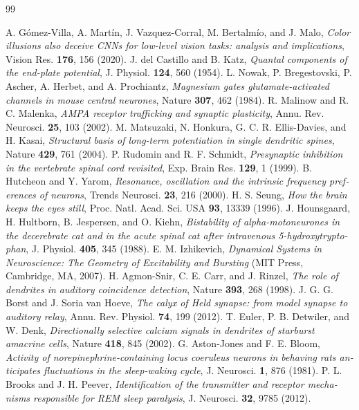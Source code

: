 \begin{thebibliography}{99}
\begin{otherlanguage}{english}
 A. G\'omez-Villa, A. Mart\'in, J. Vazquez-Corral, M. Bertalm\'io, and J. Malo, \emph{Color illusions also deceive CNNs for low-level vision tasks: analysis and implications}, Vision Res. \textbf{176}, 156 (2020).
 J. del Castillo and B. Katz, \emph{Quantal components of the end-plate potential}, J. Physiol. \textbf{124}, 560 (1954).
 L. Nowak, P. Bregestovski, P. Ascher, A. Herbet, and A. Prochiantz, \emph{Magnesium gates glutamate-activated channels in mouse central neurones}, Nature \textbf{307}, 462 (1984).
 R. Malinow and R. C. Malenka, \emph{AMPA receptor trafficking and synaptic plasticity}, Annu. Rev. Neurosci. \textbf{25}, 103 (2002).
 M. Matsuzaki, N. Honkura, G. C. R. Ellis-Davies, and H. Kasai, \emph{Structural basis of long-term potentiation in single dendritic spines}, Nature \textbf{429}, 761 (2004).
 P. Rudomin and R. F. Schmidt, \emph{Presynaptic inhibition in the vertebrate spinal cord revisited}, Exp. Brain Res. \textbf{129}, 1 (1999).
 B. Hutcheon and Y. Yarom, \emph{Resonance, oscillation and the intrinsic frequency preferences of neurons}, Trends Neurosci. \textbf{23}, 216 (2000).
 H. S. Seung, \emph{How the brain keeps the eyes still}, Proc. Natl. Acad. Sci. USA \textbf{93}, 13339 (1996).
 J. Hounsgaard, H. Hultborn, B. Jespersen, and O. Kiehn, \emph{Bistability of alpha-motoneurones in the decerebrate cat and in the acute spinal cat after intravenous 5-hydroxytryptophan}, J. Physiol. \textbf{405}, 345 (1988).
 E. M. Izhikevich, \emph{Dynamical Systems in Neuroscience: The Geometry of Excitability and Bursting} (MIT Press, Cambridge, MA, 2007).
 H. Agmon-Snir, C. E. Carr, and J. Rinzel, \emph{The role of dendrites in auditory coincidence detection}, Nature \textbf{393}, 268 (1998).
 J. G. G. Borst and J. Soria van Hoeve, \emph{The calyx of Held synapse: from model synapse to auditory relay}, Annu. Rev. Physiol. \textbf{74}, 199 (2012).
 T. Euler, P. B. Detwiler, and W. Denk, \emph{Directionally selective calcium signals in dendrites of starburst amacrine cells}, Nature \textbf{418}, 845 (2002).
 G. Aston-Jones and F. E. Bloom, \emph{Activity of norepinephrine-containing locus coeruleus neurons in behaving rats anticipates fluctuations in the sleep-waking cycle}, J. Neurosci. \textbf{1}, 876 (1981).
 P. L. Brooks and J. H. Peever, \emph{Identification of the transmitter and receptor mechanisms responsible for REM sleep paralysis}, J. Neurosci. \textbf{32}, 9785 (2012).

\end{otherlanguage}
\end{thebibliography}
